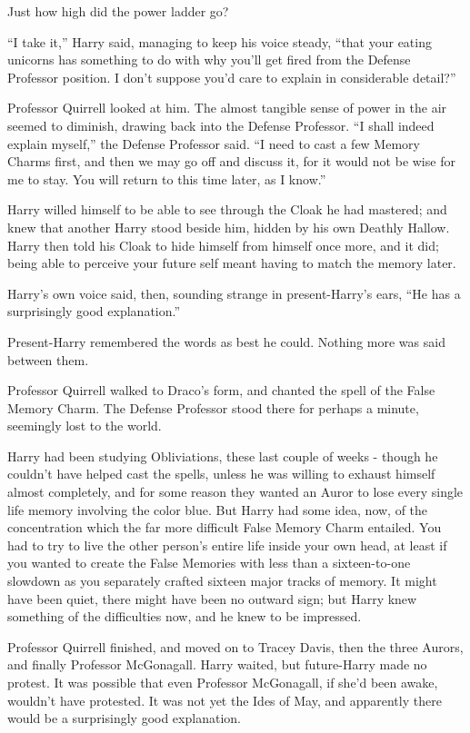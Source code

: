 Just how high did the power ladder go?

``I take it,'' Harry said, managing to keep his voice steady, ``that
your eating unicorns has something to do with why you'll get fired from
the Defense Professor position. I don't suppose you'd care to explain in
considerable detail?''

Professor Quirrell looked at him. The almost tangible sense of power in
the air seemed to diminish, drawing back into the Defense Professor. ``I
shall indeed explain myself,'' the Defense Professor said. ``I need to
cast a few Memory Charms first, and then we may go off and discuss it,
for it would not be wise for me to stay. You will return to this time
later, as I know.''

Harry willed himself to be able to see through the Cloak he had
mastered; and knew that another Harry stood beside him, hidden by his
own Deathly Hallow. Harry then told his Cloak to hide himself from
himself once more, and it did; being able to perceive your future self
meant having to match the memory later.

Harry's own voice said, then, sounding strange in present-Harry's ears,
``He has a surprisingly good explanation.''

Present-Harry remembered the words as best he could. Nothing more was
said between them.

Professor Quirrell walked to Draco's form, and chanted the spell of the
False Memory Charm. The Defense Professor stood there for perhaps a
minute, seemingly lost to the world.

Harry had been studying Obliviations, these last couple of weeks -
though he couldn't have helped cast the spells, unless he was willing to
exhaust himself almost completely, and for some reason they wanted an
Auror to lose every single life memory involving the color blue. But
Harry had some idea, now, of the concentration which the far more
difficult False Memory Charm entailed. You had to try to live the other
person's entire life inside your own head, at least if you wanted to
create the False Memories with less than a sixteen-to-one slowdown as
you separately crafted sixteen major tracks of memory. It might have
been quiet, there might have been no outward sign; but Harry knew
something of the difficulties now, and he knew to be impressed.

Professor Quirrell finished, and moved on to Tracey Davis, then the
three Aurors, and finally Professor McGonagall. Harry waited, but
future-Harry made no protest. It was possible that even Professor
McGonagall, if she'd been awake, wouldn't have protested. It was not yet
the Ides of May, and apparently there would be a surprisingly good
explanation.


